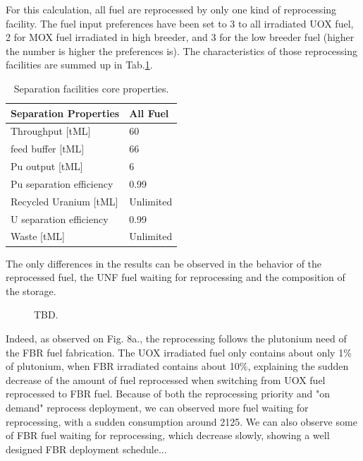 \documentclass[12pt]{article}
\begin{document}
For this calculation, all fuel are reprocessed by
only one kind of reprocessing facility. The fuel
input preferences have been set to 3 to all
irradiated UOX fuel, 2 for MOX fuel irradiated in
high breeder, and 3 for the low breeder fuel
(higher the number is higher the preferences is).
The characteristics of those reprocessing
facilities are summed up in
Tab.\ref{tab:fuelfab_2}.

\begin{table}[h!]
\centering
\begin{tabular}{ll}
\hline
Separation Properties	&	All Fuel	\\
\hline
Throughput [tML]		&	60		\\
feed buffer [tML]		&	66		\\
Pu output  [tML]		&	6		\\
Pu separation efficiency	&	0.99		\\
Recycled Uranium [tML]	&	Unlimited	\\
U separation efficiency	&	0.99		\\
Waste [tML]			&	Unlimited	\\
\hline
\end{tabular}
\caption{Separation facilities core properties.}
\label{tab:fuelfab_2}
\end{table}


The only differences in the results can be observed in the
behavior of the reprocessed fuel, the UNF fuel
waiting for reprocessing and the composition of
the storage.

\begin{figure}[h!]
\centering
{}
\caption{TBD.\label{fig:ARR_FWR_SFC_2} }
\end{figure}

Indeed, as observed on Fig. 8a., the reprocessing
follows the plutonium need of the FBR fuel
fabrication. The UOX irradiated fuel only contains
about only 1\% of plutonium, when FBR irradiated
contains about 10\%, explaining the sudden decrease
of the  amount of fuel reprocessed when switching
from UOX fuel reprocessed to FBR fuel.
Because of both the reprocessing priority and "on
demand" reprocess deployment, we can observed more
fuel waiting for reprocessing, with a sudden
consumption around 2125. We can also observe some
of FBR fuel waiting for reprocessing, which
decrease slowly, showing a well designed FBR
deployment schedule...
\end{document}
